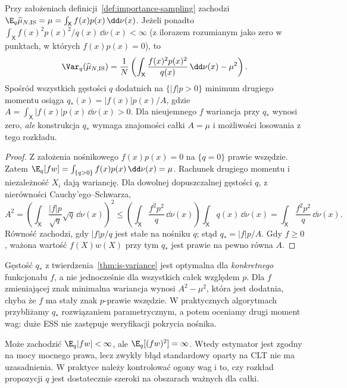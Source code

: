 \begin{twierdzenie}
\label{thm:is-variance}
Przy założeniach definicji~\ref{def:importance-sampling} zachodzi
$\E_q\widehat\mu_{N,\mathrm{IS}}=\mu=
\int_{\mathsf X}f(x)p(x)\,\dd\nu(x)$.
Jeżeli ponadto
$\int_{\mathsf X}f(x)^2p(x)^2/q(x)\,\dd\nu(x)<\infty$
(z ilorazem rozumianym jako zero w punktach, w których $f(x)p(x)=0$), to
\[
 \Var_q(\widehat\mu_{N,\mathrm{IS}})=\frac1N
 \left(\int_{\mathsf X}\frac{f(x)^2p(x)^2}{q(x)}\,
       \dd\nu(x)-\mu^2\right).
\]
Spośród wszystkich gęstości $q$ dodatnich na $\{|f|p>0\}$
minimum drugiego momentu osiąga $q_*(x)=|f(x)|p(x)/A$,
gdzie $A=\int_{\mathsf X}|f(x)|p(x)\,\dd\nu(x)>0$.
Dla nieujemnego $f$ wariancja przy $q_*$ wynosi zero,
\emph{ale} konstrukcja $q_*$ wymaga znajomości całki $A=\mu$
i możliwości losowania z tego rozkładu.
\end{twierdzenie}
\begin{proof}
Z założenia nośnikowego $f(x)p(x)=0$ na $\{q=0\}$
prawie wszędzie. Zatem
$\E_q[fw]=\int_{\{q>0\}} f(x)p(x)\,\dd\nu(x)=\mu$.
Rachunek drugiego momentu i niezależność $X_i$ dają wariancję.
Dla dowolnej dopuszczalnej gęstości $q$, z nierówności
Cauchy'ego--Schwarza,
\[
 A^2=\left(\int_{\mathsf X}
       \frac{|f|p}{\sqrt q}\sqrt q\,\dd\nu(x)\right)^2
 \le\left(\int_{\mathsf X}\frac{f^2p^2}{q}\,\dd\nu(x)\right)
       \int_{\mathsf X}q(x)\,\dd\nu(x)
 =\int_{\mathsf X}\frac{f^2p^2}{q}\,\dd\nu(x).
\]
Równość zachodzi, gdy $|f|p/q$ jest stałe na nośniku $q$;
stąd $q_*=|f|p/A$. Gdy $f\ge0$, ważona wartość
$f(X)w(X)$ przy tym $q_*$ jest prawie na pewno równa $A$.
\end{proof}

\begin{uwaga}
Gęstość $q_*$ z twierdzenia~\ref{thm:is-variance} jest optymalna dla
\emph{konkretnego} funkcjonału $f$, a nie jednocześnie dla wszystkich
całek względem $p$. Dla $f$ zmieniającej znak minimalna wariancja
wynosi $A^2-\mu^2$, która jest dodatnia, chyba że $f$ ma stały znak
$p$-prawie wszędzie. W praktycznych algorytmach przybliżamy $q_*$
rozwiązaniem parametrycznym, a potem oceniamy drugi moment wag:
duże ESS nie zastępuje weryfikacji pokrycia nośnika.
\end{uwaga}

\begin{uwaga}
Może zachodzić $\E_q|fw|<\infty$, ale
$\E_q[(fw)^2]=\infty$. Wtedy estymator jest zgodny
na mocy mocnego prawa, lecz zwykły błąd standardowy
oparty na CLT nie ma uzasadnienia. W praktyce należy
kontrolować ogony wag i to, czy rozkład propozycji
$q$ jest dostatecznie szeroki na obszarach ważnych dla całki.
\end{uwaga}

